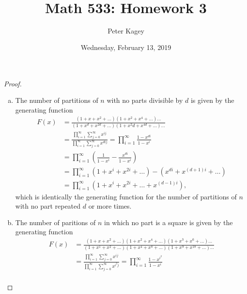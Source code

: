 \documentclass{article}
\newenvironment{problem}[2][Problem]{\begin{trivlist}
\item[\hskip \labelsep {\bfseries #1}\hskip \labelsep {\bfseries #2.}]}{\end{trivlist}}
\newcommand{\paren}[1]{\left( #1 \right)}
\begin{document}
\title{Math 533: Homework 3}
\author{Peter Kagey}
\date{Wednesday, February 13, 2019}

\maketitle

\begin{problem}{1}
\end{problem}

\begin{proof} ~
  \begin{enumerate}[(a)]
    \item The number of partitions of $n$ with no parts divisible by $d$ is
    given by the generating function \begin{align*}
      F(x)
      &= \frac{
        (1 + x + x^2 + \hdots)(1 + x^2 + x^4 + \hdots)\hdots
      }{
        (1 + x^d + x^{2d} + \hdots)(1 + x^2d + x^{4d} + \hdots)\hdots
      } \\
      &= \frac{
        \displaystyle\prod_{i=1}^\infty\sum_{j=0}^\infty x^{ij}
      }{
        \displaystyle\prod_{i=1}^\infty\sum_{j=0}^\infty x^{dij}
      }
      = \prod_{i=1}^\infty \frac{1-x^{di}}{1-x^i} \\
      &= \prod_{i=1}^\infty \paren{\frac{1}{1-x^i} - \frac{x^{di}}{1-x^i}} \\
      &= \prod_{i=1}^\infty (1 + x^i + x^{2i} + \hdots) - (x^{di} + x^{(d+1)i} + \hdots) \\
      &= \prod_{i=1}^\infty (1 + x^i + x^{2i} + \hdots + x^{(d-1)i}),
    \end{align*}
    which is identically the generating function for the number of partitions of
    $n$ with no part repeated $d$ or more times.
    \item The number of paritions of $n$ in which no part is a square is given
    by the generating function
    \begin{align*}
      F(x)
      &= \frac{
        (1 + x + x^2 + \hdots)(1 + x^2 + x^4 + \hdots)(1 + x^3 + x^6 + \hdots)\hdots
      }{
        (1 + x^1 + x^2 + \hdots)(1 + x^{4} + x^{8} + \hdots)(1 + x^9 + x^{18} + \hdots)\hdots
      } \\
      &= \frac{
        \displaystyle\prod_{i=1}^\infty\sum_{j=0}^\infty x^{ij}
      }{
        \displaystyle\prod_{i=1}^\infty\sum_{j=0}^\infty x^{i^2j}
      }
      = \prod_{i=1}^\infty \frac{1-x^{i^2}}{1-x^i} \\

\end{align*}
\end{enumerate}
\end{proof}
\end{document}
